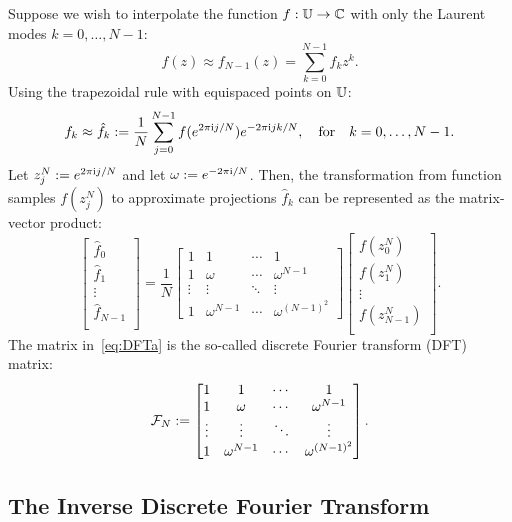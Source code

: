 Suppose we wish to interpolate the function $f:\mathbb{U}\to\mathbb{C}$ with only the Laurent modes $k=0,\ldots,N-1$:
\begin{equation}
f(z) \approx f_{N-1}(z) = \sum_{k=0}^{N-1} f_k z^k.
\end{equation}
Using the trapezoidal rule with equispaced points on $\mathbb{U}$:
\begin{equation}\label{eq:ApproximateTaylorCoefficients}
f_k \approx \hat{f}_k := \dfrac{1}{N}\sum_{j=0}^{N-1} f(e^{2\pi{\rm i} j/N})e^{-2\pi{\rm i} jk/N},\quad{\rm for}\quad k=0,\ldots,N-1.
\end{equation}
Let $z_j^N := e^{2\pi{\rm i} j/N}$ and let $\omega := e^{-2\pi{\rm i}/N}$. Then, the transformation from function samples $f(z_j^N)$ to approximate projections $\hat{f}_k$ can be represented as the matrix-vector product:
\begin{equation}\label{eq:DFTa}
\begin{bmatrix} \hat{f}_0\\ \hat{f}_1\\ \vdots\\ \hat{f}_{N-1}\\\end{bmatrix}
=
\dfrac{1}{N}
\begin{bmatrix}
1 & 1 & \cdots & 1\\
1 & \omega & \cdots & \omega^{N-1}\\
\vdots & \vdots & \ddots & \vdots\\
1 & \omega^{N-1} & \cdots & \omega^{(N-1)^2}
\end{bmatrix}
\begin{bmatrix} f(z_0^N)\\ f(z_1^N)\\ \vdots\\ f(z_{N-1}^N)\\\end{bmatrix}.
\end{equation}
The matrix in~\eqref{eq:DFTa} is the so-called discrete Fourier transform (DFT) matrix:
\begin{equation}\label{eq:DFT}
\mathcal{F}_N := \begin{bmatrix}
1 & 1 & \cdots & 1\\
1 & \omega & \cdots & \omega^{N-1}\\
\vdots & \vdots & \ddots & \vdots\\
1 & \omega^{N-1} & \cdots & \omega^{(N-1)^2}
\end{bmatrix}.
\end{equation}

\subsection{The Inverse Discrete Fourier Transform}

